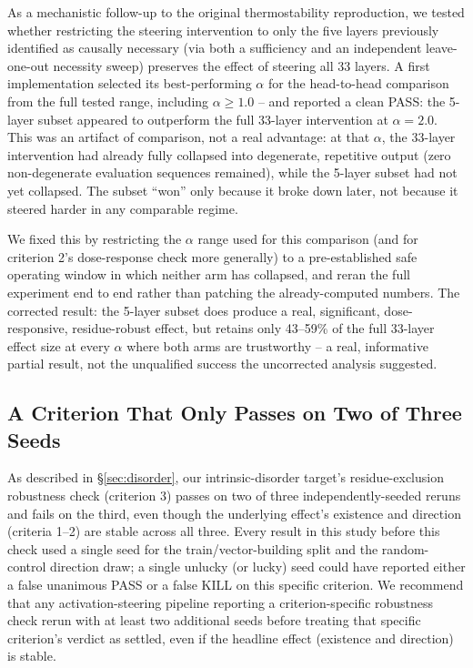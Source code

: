 \documentclass{article}
\begin{document}
As a mechanistic follow-up to the original thermostability
reproduction, we tested whether restricting the steering intervention
to only the five layers previously identified as causally necessary
(via both a sufficiency and an independent leave-one-out necessity
sweep) preserves the effect of steering all 33 layers. A first
implementation selected its best-performing $\alpha$ for the
head-to-head comparison from the full tested range, including $\alpha
\geq 1.0$ -- and reported a clean PASS: the 5-layer subset appeared to
outperform the full 33-layer intervention at $\alpha=2.0$. This was an
artifact of comparison, not a real advantage: at that $\alpha$, the
33-layer intervention had already fully collapsed into degenerate,
repetitive output (zero non-degenerate evaluation sequences remained),
while the 5-layer subset had not yet collapsed. The subset ``won'' only
because it broke down later, not because it steered harder in any
comparable regime.

We fixed this by restricting the $\alpha$ range used for this
comparison (and for criterion 2's dose-response check more generally)
to a pre-established safe operating window in which neither arm has
collapsed, and reran the full experiment end to end rather than patching
the already-computed numbers. The corrected result: the 5-layer subset
does produce a real, significant, dose-responsive, residue-robust
effect, but retains only 43--59\% of the full 33-layer effect size at
every $\alpha$ where both arms are trustworthy -- a real, informative
partial result, not the unqualified success the uncorrected analysis
suggested.

\subsection{A Criterion That Only Passes on Two of Three Seeds}

As described in \S\ref{sec:disorder}, our intrinsic-disorder target's
residue-exclusion robustness check (criterion 3) passes on two of three
independently-seeded reruns and fails on the third, even though the
underlying effect's existence and direction (criteria 1--2) are stable
across all three. Every result in this study before this check used a
single seed for the train/vector-building split and the random-control
direction draw; a single unlucky (or lucky) seed could have reported
either a false unanimous PASS or a false KILL on this specific
criterion. We recommend that any activation-steering pipeline reporting
a criterion-specific robustness check rerun with at least two additional
seeds before treating that specific criterion's verdict as settled, even
if the headline effect (existence and direction) is stable.
\end{document}
